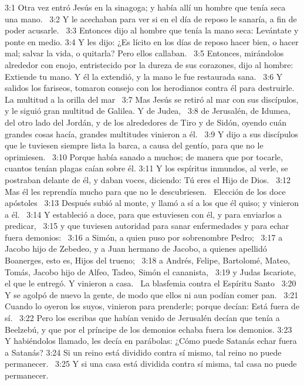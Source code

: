 3:1 Otra vez entró Jesús en la sinagoga; y había allí un hombre que tenía seca una mano.  
3:2 Y le acechaban para ver si en el día de reposo le sanaría, a fin de poder acusarle.  
3:3 Entonces dijo al hombre que tenía la mano seca: Levántate y ponte en medio. 
3:4 Y les dijo: ¿Es lícito en los días de reposo hacer bien, o hacer mal; salvar la vida, o quitarla? Pero ellos callaban.  
3:5 Entonces, mirándolos alrededor con enojo, entristecido por la dureza de sus corazones, dijo al hombre: Extiende tu mano. Y él la extendió, y la mano le fue restaurada sana.  
3:6 Y salidos los fariseos, tomaron consejo con los herodianos contra él para destruirle.  
La multitud a la orilla del mar  
3:7 Mas Jesús se retiró al mar con sus discípulos, y le siguió gran multitud de Galilea. Y de Judea,  
3:8 de Jerusalén, de Idumea, del otro lado del Jordán, y de los alrededores de Tiro y de Sidón, oyendo cuán grandes cosas hacía, grandes multitudes vinieron a él.  
3:9 Y dijo a sus discípulos que le tuviesen siempre lista la barca, a causa del gentío, para que no le oprimiesen.  
3:10 Porque había sanado a muchos; de manera que por tocarle, cuantos tenían plagas caían sobre él. 
3:11 Y los espíritus inmundos, al verle, se postraban delante de él, y daban voces, diciendo: Tú eres el Hijo de Dios.  
3:12 Mas él les reprendía mucho para que no le descubriesen.  
Elección de los doce apóstoles   
3:13 Después subió al monte, y llamó a sí a los que él quiso; y vinieron a él.  
3:14 Y estableció a doce, para que estuviesen con él, y para enviarlos a predicar,  
3:15 y que tuviesen autoridad para sanar enfermedades y para echar fuera demonios:  
3:16 a Simón, a quien puso por sobrenombre Pedro;  
3:17 a Jacobo hijo de Zebedeo, y a Juan hermano de Jacobo, a quienes apellidó Boanerges, esto es, Hijos del trueno;  
3:18 a Andrés, Felipe, Bartolomé, Mateo, Tomás, Jacobo hijo de Alfeo, Tadeo, Simón el cananista,  
3:19 y Judas Iscariote, el que le entregó. Y vinieron a casa.  
La blasfemia contra el Espíritu Santo   
3:20 Y se agolpó de nuevo la gente, de modo que ellos ni aun podían comer pan.  
3:21 Cuando lo oyeron los suyos, vinieron para prenderle; porque decían: Está fuera de sí.  
3:22 Pero los escribas que habían venido de Jerusalén decían que tenía a Beelzebú, y que por el príncipe de los demonios echaba fuera los demonios. 
3:23 Y habiéndolos llamado, les decía en parábolas: ¿Cómo puede Satanás echar fuera a Satanás? 
3:24 Si un reino está dividido contra sí mismo, tal reino no puede permanecer.  
3:25 Y si una casa está dividida contra sí misma, tal casa no puede permanecer.  
